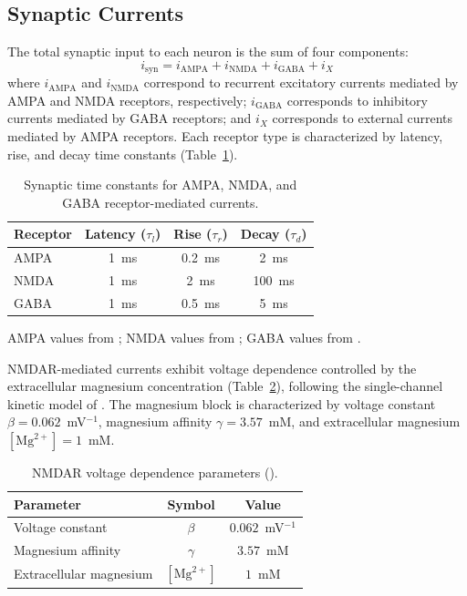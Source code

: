 \documentclass[10pt]{article}
\begin{document}
\subsection{Synaptic Currents}

The total synaptic input to each neuron is the sum of four components:
\begin{equation}
i_{\text{syn}} = i_{\text{AMPA}} + i_{\text{NMDA}} + i_{\text{GABA}} + i_X
\end{equation}
where $i_{\text{AMPA}}$ and $i_{\text{NMDA}}$ correspond to recurrent
excitatory currents mediated by AMPA and NMDA receptors, respectively;
$i_{\text{GABA}}$ corresponds to inhibitory currents mediated by GABA
receptors; and $i_X$ corresponds to external currents mediated by AMPA
receptors. Each receptor type is characterized by latency, rise, and decay
time constants (Table~\ref{tab:synaptic_params}).

\begin{table}[htbp]
\centering
\caption{Synaptic time constants for AMPA, NMDA, and GABA receptor-mediated currents.}
\label{tab:synaptic_params}
\begin{tabular}{lccc}
\toprule
Receptor & Latency ($\tau_l$) & Rise ($\tau_r$) & Decay ($\tau_d$) \\
\midrule
AMPA & 1~ms & 0.2~ms & 2~ms \\
NMDA & 1~ms & 2~ms & 100~ms \\
GABA & 1~ms & 0.5~ms & 5~ms \\
\bottomrule
\end{tabular}
\begin{flushleft}
\footnotesize{AMPA values from \citet{zhou1998ampa}; NMDA values from
\citet{hestrin1990analysis}; GABA values from \citet{gupta2000organizing}.}
\end{flushleft}
\end{table}

NMDAR-mediated currents exhibit voltage dependence controlled by the
extracellular magnesium concentration (Table~\ref{tab:nmdar_params}), following
the single-channel kinetic model of \citet{jahr1990voltage}. The magnesium
block is characterized by voltage constant $\beta = 0.062$~mV$^{-1}$,
magnesium affinity $\gamma = 3.57$~mM, and extracellular magnesium
$[\text{Mg}^{2+}] = 1$~mM.

\begin{table}[htbp]
\centering
\caption{NMDAR voltage dependence parameters (\citet{jahr1990voltage}).}
\label{tab:nmdar_params}
\begin{tabular}{lcc}
\toprule
Parameter & Symbol & Value \\
\midrule
Voltage constant & $\beta$ & $0.062$~mV$^{-1}$ \\
Magnesium affinity & $\gamma$ & $3.57$~mM \\
Extracellular magnesium & $[\text{Mg}^{2+}]$ & $1$~mM \\
\bottomrule
\end{tabular}
\end{table}
\end{document}
